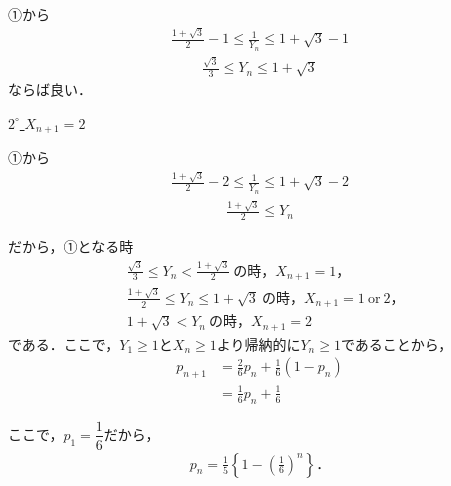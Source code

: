 \documentclass[../main.tex]{subfiles}
\begin{document}
①から
\begin{align*}
\frac{1+\sqrt3}2-1\le\frac1{Y_n}\le1+\sqrt3-1
\end{align*}
\begin{align*}
\frac{\sqrt3}3\le Y_n\le1+\sqrt3
\end{align*}
ならば良い．

\underline{$2^\circ$ $X_{n+1}=2$}

①から
\begin{align*}
\frac{1+\sqrt3}2-2\le\frac1{Y_n}\le1+\sqrt3-2
\end{align*}
\begin{align*}
\frac{1+\sqrt3}2\le Y_n
\end{align*}

だから，①となる時
\begin{align*}
&\frac{\sqrt3}3\le Y_n<\frac{1+\sqrt3}2\ \text{の時，}X_{n+1}=1，\\
&\frac{1+\sqrt3}2\le Y_n\le1+\sqrt3\ \text{の時，}X_{n+1}=1\ \text{or}\ 2，\\
&1+\sqrt3<Y_n\ \text{の時，}X_{n+1}=2
\end{align*}
である．ここで，$Y_1\ge1$と$X_n\ge1$より帰納的に$Y_n\ge1$であることから，
\begin{align*}
p_{n+1}&=\frac26p_n+\frac16(1-p_n)\\
&=\frac16p_n+\frac16
\end{align*}

ここで，$p_1=\dfrac16$だから，
\begin{align*}
p_n=\frac15\left\{1-\left(\frac16\right)^n\right\}．
\end{align*}

\newpage
\end{document}
